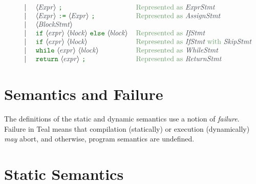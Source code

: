 \documentclass{article}
\newcommand{\ntaX}[1]{\ensuremath{\textcolor{cyan!20!black}{\textit{#1}}}}
\newcommand{\VB}{\ |\ }
\newcommand{\tuple}[1]{\ensuremath{\langle #1 \rangle}}
\newcommand{\vterminal}[1]{\textsf{\textcolor{dgreen}{\texttt{#1}}}}
\newcommand{\nt}[1]{\ensuremath{\tuple{\hspace{-0.02cm}\ntaX{#1}\hspace{0.02cm}}}}
\newcommand{\astmap}[1]{\textrm{\textcolor{green!20!grey}{#1}}}
\newcommand{\failure}{\textcolor{dred}{failure}}
\begin{document}
\[\begin{array}[t]{lcl@{\hspace{0.4cm}}l}
               & \VB   & \nt{Expr}\ \vterminal{;} & \astmap{Represented as } \ntaX{ExprStmt}\\
               & \VB   & \nt{Expr}\ \vterminal{:=}\ \nt{Expr}\ \vterminal{;} & \astmap{Represented as } \ntaX{AssignStmt}\\
               & \VB   & \nt{BlockStmt} \\
               & \VB   & \vterminal{if}\ \nt{expr}\ \nt{block}\ \vterminal{else}\ \nt{block} & \astmap{Represented as } \ntaX{IfStmt}\\
               & \VB   & \vterminal{if}\ \nt{expr}\ \nt{block}\ & \astmap{Represented as \ntaX{IfStmt} with \ntaX{SkipStmt}} \\
               & \VB   & \vterminal{while}\ \nt{expr}\ \nt{block} & \astmap{Represented as } \ntaX{WhileStmt}\\
               & \VB   & \vterminal{return}\ \nt{expr}\ \vterminal{;} & \astmap{Represented as } \ntaX{ReturnStmt}\\
  \end{array}
\]

\section{Semantics and Failure}
The definitions of the static and dynamic semantics use a notion of
\emph{\failure{}}.  Failure in Teal means that compilation (statically)
or execution (dynamically) \emph{may} abort, and otherwise, program
semantics are undefined.

\section{Static Semantics}
\end{document}
